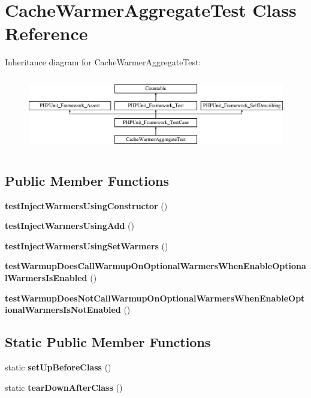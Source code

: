 \section{Cache\+Warmer\+Aggregate\+Test Class Reference}
\label{class_symfony_1_1_component_1_1_http_kernel_1_1_tests_1_1_cache_warmer_1_1_cache_warmer_aggregate_test}
Inheritance diagram for Cache\+Warmer\+Aggregate\+Test\+:\begin{figure}[H]
\begin{center}
\leavevmode
\includegraphics[height=3.303835cm]{class_symfony_1_1_component_1_1_http_kernel_1_1_tests_1_1_cache_warmer_1_1_cache_warmer_aggregate_test}
\end{center}
\end{figure}
\subsection*{Public Member Functions}
\begin{DoxyCompactItemize}
\item 
{\bf test\+Inject\+Warmers\+Using\+Constructor} ()
\item 
{\bf test\+Inject\+Warmers\+Using\+Add} ()
\item 
{\bf test\+Inject\+Warmers\+Using\+Set\+Warmers} ()
\item 
{\bf test\+Warmup\+Does\+Call\+Warmup\+On\+Optional\+Warmers\+When\+Enable\+Optional\+Warmers\+Is\+Enabled} ()
\item 
{\bf test\+Warmup\+Does\+Not\+Call\+Warmup\+On\+Optional\+Warmers\+When\+Enable\+Optional\+Warmers\+Is\+Not\+Enabled} ()
\end{DoxyCompactItemize}
\subsection*{Static Public Member Functions}
\begin{DoxyCompactItemize}
\item 
static {\bf set\+Up\+Before\+Class} ()
\item 
static {\bf tear\+Down\+After\+Class} ()
\end{DoxyCompactItemize}
